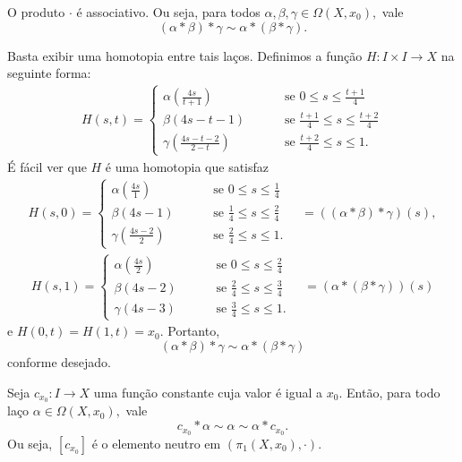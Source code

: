 \begin{lemma}
    O produto $\cdot$ é associativo. Ou seja, para todos $\alpha,\beta,\gamma\in\Omega(X,x_0),$ vale
    \[(\alpha*\beta)*\gamma\sim \alpha*(\beta*\gamma).\]
\end{lemma}

\begin{dem}
    Basta exibir uma homotopia entre tais laços. Definimos a função $H:I\times I\rightarrow X$ na seguinte forma:
    \begin{align*}
        H(s,t)=\begin{cases}
            \alpha(\frac{4s}{t+1})\qquad &\mbox{ se }0\le s \le \frac{t+1}{4}\\
            \beta(4s-t-1)\qquad &\mbox{ se }\frac{t+1}{4}\le s\le\frac{t+2}{4}\\
            \gamma(\frac{4s-t-2}{2-t})\qquad &\mbox{ se }\frac{t+2}{4}\le s\le 1.
        \end{cases}
    \end{align*}
    É fácil ver que $H$ é uma homotopia que satisfaz
    \begin{align*}
        H(s,0)=\begin{cases}
            \alpha(\frac{4s}{1})\qquad &\mbox{ se }0\le s \le \frac{1}{4}\\
            \beta(4s-1)\qquad &\mbox{ se }\frac{1}{4}\le s\le\frac{2}{4}\\
            \gamma(\frac{4s-2}{2})\qquad &\mbox{ se }\frac{2}{4}\le s\le 1.
        \end{cases}\quad=((\alpha*\beta)*\gamma)(s),
    \end{align*}
    \begin{align*}
        H(s,1)=\begin{cases}
            \alpha(\frac{4s}{2})\qquad &\mbox{ se }0\le s \le \frac{2}{4}\\
            \beta(4s-2)\qquad &\mbox{ se }\frac{2}{4}\le s\le\frac{3}{4}\\
            \gamma(4s-3)\qquad &\mbox{ se }\frac{3}{4}\le s\le 1.
        \end{cases}\quad=(\alpha*(\beta*\gamma))(s)
    \end{align*}
    e $H(0,t)=H(1,t)=x_0.$ Portanto, $$(\alpha*\beta)*\gamma\sim \alpha*(\beta*\gamma)$$ conforme desejado.
\end{dem}

\begin{lemma}
    Seja $c_{x_0}:I\rightarrow X$ uma função constante cuja valor é igual a $x_0.$ Então, para todo laço $\alpha\in \Omega(X,x_0),$ vale
    $$c_{x_0}*\alpha\sim\alpha\sim\alpha*c_{x_0}.$$
    Ou seja, $[c_{x_0}]$ é o elemento neutro em $(\pi_1(X,x_0),\cdot)$.
\end{lemma}


